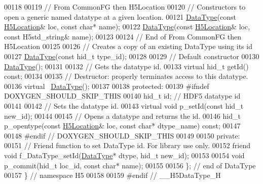 \begin{DoxyCode}
00118 
00119 \textcolor{comment}{// From CommonFG then H5Location}
00120         \textcolor{comment}{// Constructors to open a generic named datatype at a given location.}
00121         \hyperlink{class_h5_1_1_data_type}{DataType}(\textcolor{keyword}{const} \hyperlink{class_h5_1_1_h5_location}{H5Location}& loc, \textcolor{keyword}{const} \textcolor{keywordtype}{char}* name);
00122         \hyperlink{class_h5_1_1_data_type}{DataType}(\textcolor{keyword}{const} \hyperlink{class_h5_1_1_h5_location}{H5Location}& loc, \textcolor{keyword}{const} H5std\_string& name);
00123 
00124 \textcolor{comment}{// End of From CommonFG then H5Location}
00125 
00126         \textcolor{comment}{// Creates a copy of an existing DataType using its id}
00127         \hyperlink{class_h5_1_1_data_type}{DataType}(\textcolor{keyword}{const} hid\_t type\_id);
00128 
00129         \textcolor{comment}{// Default constructor}
00130         \hyperlink{class_h5_1_1_data_type}{DataType}();
00131 
00132         \textcolor{comment}{// Gets the datatype id.}
00133         \textcolor{keyword}{virtual} hid\_t getId() \textcolor{keyword}{const};
00134 
00135         \textcolor{comment}{// Destructor: properly terminates access to this datatype.}
00136         \textcolor{keyword}{virtual} ~\hyperlink{class_h5_1_1_data_type}{DataType}();
00137 
00138    \textcolor{keyword}{protected}:
00139 \textcolor{preprocessor}{#ifndef DOXYGEN\_SHOULD\_SKIP\_THIS}
00140         hid\_t id;    \textcolor{comment}{// HDF5 datatype id}
00141 
00142         \textcolor{comment}{// Sets the datatype id.}
00143         \textcolor{keyword}{virtual} \textcolor{keywordtype}{void} p\_setId(\textcolor{keyword}{const} hid\_t new\_id);
00144 
00145         \textcolor{comment}{// Opens a datatype and returns the id.}
00146         hid\_t p\_opentype(\textcolor{keyword}{const} \hyperlink{class_h5_1_1_h5_location}{H5Location}& loc, \textcolor{keyword}{const} \textcolor{keywordtype}{char}* dtype\_name) \textcolor{keyword}{const};
00147 
00148 \textcolor{preprocessor}{#endif // DOXYGEN\_SHOULD\_SKIP\_THIS}
00149 
00150    \textcolor{keyword}{private}:
00151         \textcolor{comment}{// Friend function to set DataType id.  For library use only.}
00152         \textcolor{keyword}{friend} \textcolor{keywordtype}{void} f\_DataType\_setId(\hyperlink{class_h5_1_1_data_type}{DataType}* dtype, hid\_t new\_id);
00153 
00154         \textcolor{keywordtype}{void} p\_commit(hid\_t loc\_id, \textcolor{keyword}{const} \textcolor{keywordtype}{char}* name);
00155 
00156 \}; \textcolor{comment}{// end of DataType}
00157 \} \textcolor{comment}{// namespace H5}
00158 
00159 \textcolor{preprocessor}{#endif // \_\_H5DataType\_H}
\end{DoxyCode}
